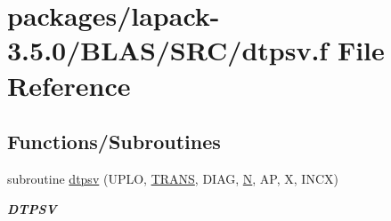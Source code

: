 \hypertarget{lapack-3_85_80_2BLAS_2SRC_2dtpsv_8f}{}\section{packages/lapack-\/3.5.0/\+B\+L\+A\+S/\+S\+R\+C/dtpsv.f File Reference}
\label{lapack-3_85_80_2BLAS_2SRC_2dtpsv_8f}
\subsection*{Functions/\+Subroutines}
\begin{DoxyCompactItemize}
\item 
subroutine \hyperlink{group__double__blas__level2_ga0fff73e765a7655a67da779c898863f1}{dtpsv} (U\+P\+L\+O, \hyperlink{superlu__enum__consts_8h_a0c4e17b2d5cea33f9991ccc6a6678d62a1f61e3015bfe0f0c2c3fda4c5a0cdf58}{T\+R\+A\+N\+S}, D\+I\+A\+G, \hyperlink{polmisc_8c_a0240ac851181b84ac374872dc5434ee4}{N}, A\+P, X, I\+N\+C\+X)
\begin{DoxyCompactList}\small\item\em {\bfseries D\+T\+P\+S\+V} \end{DoxyCompactList}\end{DoxyCompactItemize}
